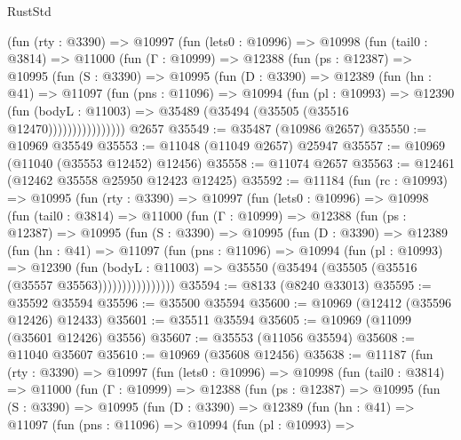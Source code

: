 \begin{lexlean}{RustStd}
\begin{coremodule}
        (fun (rty : @3390) =>
        @10997
          (fun (lets0 : @10996) =>
          @10998
            (fun (tail0 : @3814) =>
            @11000
              (fun (Γ : @10999) =>
              @12388
                (fun (ps : @12387) =>
                @10995
                  (fun (S : @3390) =>
                  @10995
                    (fun (D : @3390) =>
                    @12389
                      (fun (hn : @41) =>
                      @11097
                        (fun (pns : @11096) =>
                        @10994
                          (fun (pl : @10993) =>
                          @12390
                            (fun (bodyL : @11003) =>
                            @35489 (@35494 (@35505 (@35516 @12470))))))))))))))))
    @2657
@35549 := @35487 (@10986 @2657)
@35550 := @10969 @35549
@35553 := @11048 (@11049 @2657) @25947
@35557 := @10969 (@11040 (@35553 @12452) @12456)
@35558 := @11074 @2657
@35563 := @12461 (@12462 @35558 @25950 @12423 @12425)
@35592 := @11184
    (fun (rc : @10993) =>
    @10995
      (fun (rty : @3390) =>
      @10997
        (fun (lets0 : @10996) =>
        @10998
          (fun (tail0 : @3814) =>
          @11000
            (fun (Γ : @10999) =>
            @12388
              (fun (ps : @12387) =>
              @10995
                (fun (S : @3390) =>
                @10995
                  (fun (D : @3390) =>
                  @12389
                    (fun (hn : @41) =>
                    @11097
                      (fun (pns : @11096) =>
                      @10994
                        (fun (pl : @10993) =>
                        @12390
                          (fun (bodyL : @11003) =>
                          @35550 (@35494 (@35505 (@35516 (@35557 @35563))))))))))))))))
@35594 := @8133 (@8240 @33013)
@35595 := @35592 @35594
@35596 := @35500 @35594
@35600 := @10969 (@12412 (@35596 @12426) @12433)
@35601 := @35511 @35594
@35605 := @10969 (@11099 (@35601 @12426) @3556)
@35607 := @35553 (@11056 @35594)
@35608 := @11040 @35607
@35610 := @10969 (@35608 @12456)
@35638 := @11187
    (fun (rty : @3390) =>
    @10997
      (fun (lets0 : @10996) =>
      @10998
        (fun (tail0 : @3814) =>
        @11000
          (fun (Γ : @10999) =>
          @12388
            (fun (ps : @12387) =>
            @10995
              (fun (S : @3390) =>
              @10995
                (fun (D : @3390) =>
                @12389
                  (fun (hn : @41) =>
                  @11097
                    (fun (pns : @11096) =>
                    @10994
                      (fun (pl : @10993) =>

\end{coremodule}
\end{lexlean}
